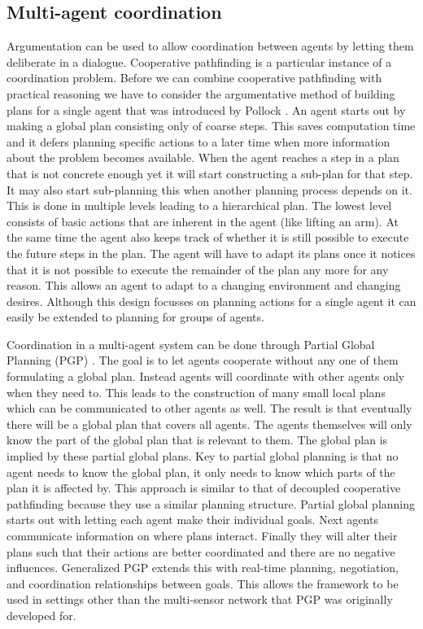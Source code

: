 \subsection{Multi-agent coordination}
Argumentation can be used to allow coordination between agents by letting them
deliberate in a dialogue. Cooperative pathfinding is a particular instance of a
coordination problem. Before we can combine cooperative pathfinding with
practical reasoning we have to consider the
argumentative method of building plans for a single agent that was introduced
by Pollock \cite{pollock1995}. An agent starts out by making a global plan
consisting only of coarse steps. This saves computation time and it defers
planning specific actions to a later time when more information about the
problem becomes available. When the agent reaches a step in a plan that is not
concrete enough yet it will start constructing a sub-plan for that step. It may
also start sub-planning this when another planning process depends on it. This
is done in
multiple levels leading to a hierarchical plan. The lowest level consists of
basic actions that are inherent in the agent (like lifting an arm). At the same
time the agent also keeps track of whether it is still possible to execute the
future steps in the plan. The agent will have to adapt its plans once it
notices that
it is not possible to execute the remainder of the plan
any more for any
reason. This allows an agent to adapt to a changing environment and changing
desires. Although this design focusses on planning actions for a single agent
it can easily be extended to planning for groups of agents.

Coordination in a multi-agent system can be done through Partial Global
Planning (PGP) \cite[pp. 202--204]{durfee1991,decker1992,woodridge2009}. The
goal is to
let agents cooperate without any one of them formulating a global plan. Instead
agents will coordinate with other agents only when they need to. This leads to
the construction of many small local plans which can be communicated to other
agents as well. The result is that eventually there will be a global plan that
covers all agents. The agents themselves will only know the part of the global
plan that is relevant to them. The global plan is implied by these partial
global plans. Key to
partial global planning is that no agent needs to know the global plan, it only
needs to know which parts of the plan it is affected by. This approach is
similar to that of decoupled cooperative pathfinding because they use a similar
planning structure. Partial global planning starts out with letting each agent
make their individual goals. Next agents communicate information on where plans
interact. Finally they will alter their plans such that their actions are
better coordinated and there are no negative influences. Generalized PGP
\cite{decker1992} extends this with real-time planning, negotiation, and
coordination relationships between goals. This allows the framework to be used
in settings other than the multi-sensor network that PGP was originally
developed for.

